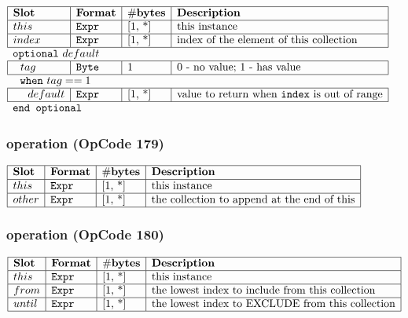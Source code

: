 \noindent
\(\begin{array}{| l | l | l | l |}
    \hline
    \bf{Slot} & \bf{Format} & \bf{\#bytes} & \bf{Description} \\
    \hline
         this & \lst{Expr} & \text{[1, *]} & \text{this instance} \\
    \hline
           index & \lst{Expr} & \text{[1, *]} & \text{index of the element of this collection} \\
    \hline
          \multicolumn{4}{l}{\lst{optional}~default} \\
    \hline
    ~~tag & \lst{Byte} & 1 & \text{0 - no value; 1 - has value} \\
    \hline
    \multicolumn{4}{l}{~~\lst{when}~tag == 1} \\
    \hline
             ~~~~ default & \lst{Expr} & \text{[1, *]} & \text{value to return when \lst{index} is out of range} \\
    \hline
          \multicolumn{4}{l}{\lst{end optional}} \\
\end{array}\)
       

\subsubsection{ operation (OpCode 179)}

\noindent
\(\begin{array}{| l | l | l | l |}
    \hline
    \bf{Slot} & \bf{Format} & \bf{\#bytes} & \bf{Description} \\
    \hline
         this & \lst{Expr} & \text{[1, *]} & \text{this instance} \\
    \hline
           other & \lst{Expr} & \text{[1, *]} & \text{the collection to append at the end of this} \\
    \hline
      
\end{array}\)
       

\subsubsection{ operation (OpCode 180)}

\noindent
\(\begin{array}{| l | l | l | l |}
    \hline
    \bf{Slot} & \bf{Format} & \bf{\#bytes} & \bf{Description} \\
    \hline
         this & \lst{Expr} & \text{[1, *]} & \text{this instance} \\
    \hline
           from & \lst{Expr} & \text{[1, *]} & \text{the lowest index to include from this collection} \\
    \hline
           until & \lst{Expr} & \text{[1, *]} & \text{the lowest index to EXCLUDE from this collection} \\
    \hline
      
\end{array}\)
       

